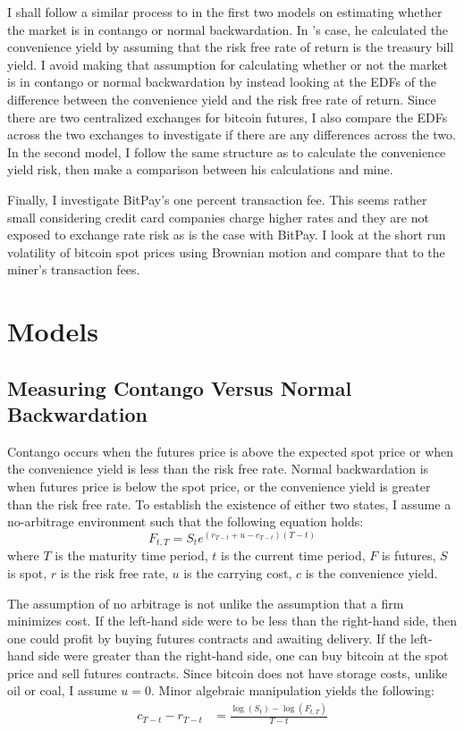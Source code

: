 \documentclass{paper}
\begin{document}
\begin{doublespacing}
I shall follow a similar process to \citeauthor{ozvatic2015} in the first two models on estimating whether the market is in contango or normal backwardation. In \citeauthor{ozvatic2015}'s case, he calculated the convenience yield by assuming that the risk free rate of return is the treasury bill yield. I avoid making that assumption for calculating whether or not the market is in contango or normal backwardation by instead looking at the EDFs of the difference between the convenience yield and the risk free rate of return. Since there are two centralized exchanges for bitcoin futures, I also compare the EDFs across the two exchanges to investigate if there are any differences across the two. In the second model, I follow the same structure as \citeauthor{ozvatic2015} to calculate the convenience yield risk, then make a comparison between his calculations and mine.

Finally, I investigate BitPay's one percent transaction fee. This seems rather small considering credit card companies charge higher rates and they are not exposed to exchange rate risk as is the case with BitPay. I look at the short run volatility of bitcoin spot prices using Brownian motion and compare that to the miner's transaction fees.

\section{Models}
\subsection{Measuring Contango Versus Normal Backwardation}
Contango occurs when the futures price is above the expected spot price or when the convenience yield is less than the risk free rate. Normal backwardation is when futures price is below the spot price, or the convenience yield is greater than the risk free rate.
To establish the existence of either two states, I assume a no-arbitrage environment such that the following equation holds:
$$F_{t,T} = S_{t}e^{(r_{T-t} + u - c_{T-t})(T-t)}$$
where $T$ is the maturity time period, $t$ is the current time period, $F$ is futures, $S$ is spot, $r$ is the risk free rate, $u$ is the carrying cost, $c$ is the convenience yield.

The assumption of no arbitrage is not unlike the assumption that a firm minimizes cost. If the left-hand side were to be less than the right-hand side, then one could profit by buying futures contracts and awaiting delivery. If the left-hand side were greater than the right-hand side, one can buy bitcoin at the spot price and sell futures contracts. Since bitcoin does not have storage costs, unlike oil or coal, I assume $u = 0$. Minor algebraic manipulation yields the following:
\begin{align}
c_{T-t} - r_{T-t} &= \frac{\log(S_{t})-\log(F_{t,T})}{T-t}\label{cont}
\end{align}


\end{doublespacing}
\end{document}

